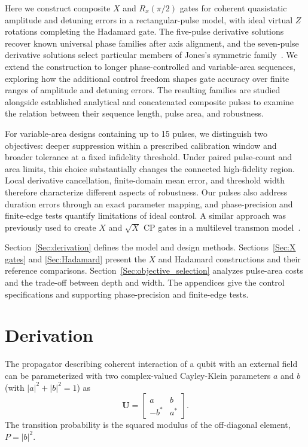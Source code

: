 \documentclass[10pt,aps,twocolumn,pra,floatfix,superscriptaddress]{revtex4-2}
\def\be{ \begin{equation} }
\def\ee{ \end{equation} }
\begin{document}
Here we construct composite $X$ and $R_x(\pi/2)$ gates for coherent quasistatic amplitude and detuning errors in a rectangular-pulse model, with ideal virtual \(Z\) rotations completing the Hadamard gate. The five-pulse derivative solutions recover known universal phase families after axis alignment, and the
seven-pulse derivative solutions select particular members of Jones's symmetric family~\cite{Jones_2013_NOT}. We extend the construction to longer phase-controlled and variable-area sequences, exploring how the additional control freedom shapes gate accuracy over finite ranges of amplitude and detuning errors. The resulting families are studied alongside established analytical and concatenated composite pulses to examine the relation between their sequence length, pulse area, and robustness.

For variable-area designs containing up to 15 pulses, we distinguish two objectives: deeper suppression within a prescribed calibration window and broader tolerance at a fixed infidelity threshold.  Under paired pulse-count and area limits, this choice substantially changes the connected high-fidelity region. Local derivative cancellation, finite-domain mean error, and threshold width therefore characterize different aspects of robustness. Our pulses also address duration errors through an exact parameter mapping, and phase-precision and finite-edge tests quantify limitations of ideal control. A similar approach was previously used to create $X$ and $\sqrt{X}$ CP
gates in a multilevel transmon model~\cite{Transmon_CP}.

Section~\ref{Sec:derivation} defines the model and design methods. Sections~\ref{Sec:X gates} and \ref{Sec:Hadamard} present the $X$ and Hadamard constructions and their reference comparisons. Section~\ref{Sec:objective_selection} analyzes pulse-area costs and the trade-off between depth and width. The appendices give the control specifications and supporting phase-precision and finite-edge tests.

\section{Derivation \label{Sec:derivation}}

The propagator describing coherent interaction of a qubit with an external field can be parameterized with two complex-valued Cayley-Klein parameters \cite{Shore_2011} $a$ and $b$ (with $|a|^2+|b|^2=1$) as
\be
\mathbf{U} = 
\left[\begin{array}{cc}
a & b \\
-b^\ast & a^\ast
\end{array}
\right] .
\label{eq:kleinparms}
\ee
The transition probability is the squared modulus of the off-diagonal element, $P=|b|^2$. 
\end{document}
